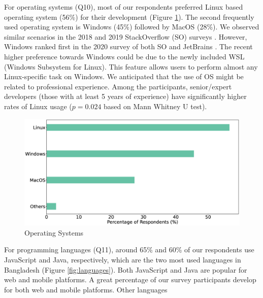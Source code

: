 
For operating systems (Q10), most of our
respondents preferred Linux based operating system (56\%) for their development (Figure \ref{fig:os}). The second frequently used
operating system is Windows (45\%) followed by MacOS (28\%). We
observed similar scenarios in the 2018 and 2019 StackOverflow (SO) surveys
\cite{StackoverflowSurvey2018,StackoverflowSurvey2019}. However, Windows ranked
first in the 2020 survey of both SO and JetBrains \cite{StackoverflowSurvey2020,
JetBrains2020}. The recent higher preference towards Windows could be due to the newly
included WSL (Windows Subsystem for Linux). This feature allows users to perform
almost any Linux-specific task on Windows. We anticipated that the use of OS
might be related to professional experience. Among the participants,
senior/expert developers (those with at least 5 years of experience) have significantly higher rates of Linux usage ($p=0.024$ based on Mann Whitney U test). 
\begin{figure}[h]
\centering
  \includegraphics[scale=0.17]{Figures/Respondents_os}
  \caption{Operating Systems}
  \label{fig:os}
\end{figure}
For programming languages (Q11), around 65\% and 60\% of our respondents use JavaScript and
Java, respectively, which are the two most used languages in Bangladesh (Figure
\ref{fig:languages}). Both JavaScript and Java are popular for web and mobile
platforms. A great percentage of our survey participants develop for both
web and mobile platforms. Other languages
